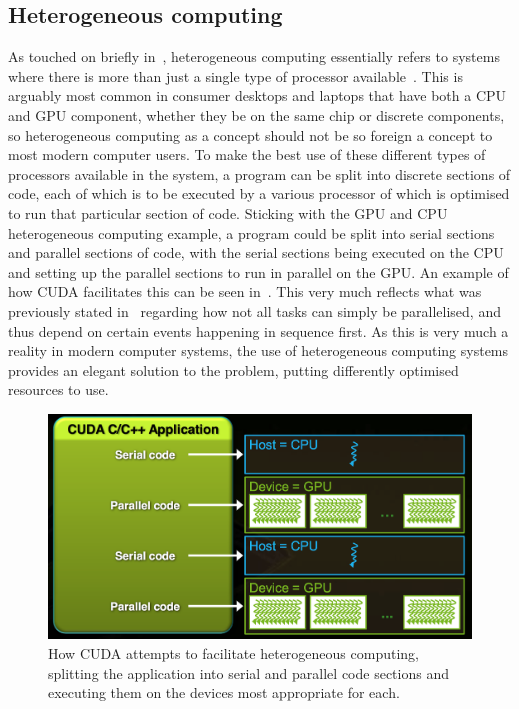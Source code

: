 \documentclass[a4paper,11pt]{article}
\begin{document}
\subsection{Heterogeneous computing} %
\label{sub:heterogeneous_computing}
As touched on briefly in~, heterogeneous computing essentially refers
to systems where there is more than just a single type of processor available~\cite{web:AMDHeteroComp}. This is
arguably most common in consumer desktops and laptops that have both a CPU and GPU component, whether they be on the
same chip or discrete components, so heterogeneous computing as a concept should not be so foreign a concept to most modern
computer users. To make the best use of these different types of processors available in the system, a program can be split
into discrete sections of code, each of which is to be executed by a various processor of which is optimised to run that particular
section of code. Sticking with the GPU and CPU heterogeneous computing example, a program could be split into serial sections
and parallel sections of code, with the serial sections being executed on the CPU and setting up the parallel sections to
run in parallel on the GPU. An example of how CUDA facilitates this can be seen in~. This very much
reflects what was previously stated in~ regarding
how not all tasks can simply be parallelised, and thus depend on certain events happening in sequence first. As this is
very much a reality in modern computer systems, the use of heterogeneous computing systems provides an elegant solution
to the problem, putting differently optimised resources to use.

\begin{figure}[ht]
  \centering
  \includegraphics[scale=0.3]{img/cuda-hetero}
  \caption{How CUDA attempts to facilitate heterogeneous computing, splitting the application into serial and parallel
  code sections and executing them on the devices most appropriate for each.~\cite{slides:KhronosOpenCLOverview}}
\label{fig:cuda-hetero}
\end{figure}
\end{document}
